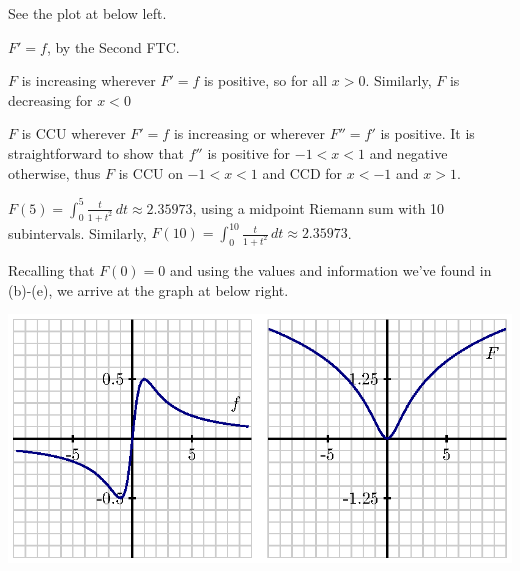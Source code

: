 \begin{activitySolution}
\ba
	\item See the plot at below left.
	\item $F' = f$, by the Second FTC.
	\item $F$ is increasing wherever $F'=f$ is positive, so for all $x > 0$.  Similarly, $F$ is decreasing for $x < 0$
	\item $F$ is CCU wherever $F' = f$ is increasing or wherever $F'' = f'$ is positive.  It is straightforward to show that $f''$ is positive for $-1 < x < 1$ and negative otherwise, thus $F$ is CCU on $-1 < x < 1$ and CCD for $x < -1$ and $x > 1$.
	\item $F(5) = \int_0^5 \frac{t}{1+t^2} \, dt \approx 2.35973$, using a midpoint Riemann sum with 10 subintervals.  Similarly, $F(10) = \int_0^{10} \frac{t}{1+t^2} \, dt \approx 2.35973$.
	\item Recalling that $F(0) = 0$ and using the values and information we've found in (b)-(e), we arrive at the graph at below right.
\ea
\begin{center}
\includegraphics{figures/5_2_Act2_soln.eps}
\end{center}
\end{activitySolution}
\aftera